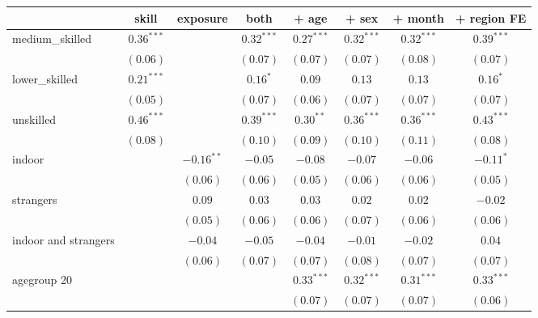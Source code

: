 
\begin{table}
\begin{center}
\begin{tabular}{l c c c c c c c }
\hline
 & skill & exposure & both & + age & + sex & + month & + region FE \\
\hline
medium\_skilled      & $0.36^{***}$ &              & $0.32^{***}$ & $0.27^{***}$ & $0.32^{***}$ & $0.32^{***}$ & $0.39^{***}$  \\
                     & $(0.06)$     &              & $(0.07)$     & $(0.07)$     & $(0.07)$     & $(0.08)$     & $(0.07)$      \\
lower\_skilled       & $0.21^{***}$ &              & $0.16^{*}$   & $0.09$       & $0.13$       & $0.13$       & $0.16^{*}$    \\
                     & $(0.05)$     &              & $(0.07)$     & $(0.06)$     & $(0.07)$     & $(0.07)$     & $(0.07)$      \\
unskilled            & $0.46^{***}$ &              & $0.39^{***}$ & $0.30^{**}$  & $0.36^{***}$ & $0.36^{***}$ & $0.43^{***}$  \\
                     & $(0.08)$     &              & $(0.10)$     & $(0.09)$     & $(0.10)$     & $(0.11)$     & $(0.08)$      \\
indoor               &              & $-0.16^{**}$ & $-0.05$      & $-0.08$      & $-0.07$      & $-0.06$      & $-0.11^{*}$   \\
                     &              & $(0.06)$     & $(0.06)$     & $(0.05)$     & $(0.06)$     & $(0.06)$     & $(0.05)$      \\
strangers            &              & $0.09$       & $0.03$       & $0.03$       & $0.02$       & $0.02$       & $-0.02$       \\
                     &              & $(0.05)$     & $(0.06)$     & $(0.06)$     & $(0.07)$     & $(0.06)$     & $(0.06)$      \\
indoor and strangers &              & $-0.04$      & $-0.05$      & $-0.04$      & $-0.01$      & $-0.02$      & $0.04$        \\
                     &              & $(0.06)$     & $(0.07)$     & $(0.07)$     & $(0.08)$     & $(0.07)$     & $(0.07)$      \\
agegroup 20          &              &              &              & $0.33^{***}$ & $0.32^{***}$ & $0.31^{***}$ & $0.33^{***}$  \\
                     &              &              &              & $(0.07)$     & $(0.07)$     & $(0.07)$     & $(0.06)$      \\

\end{tabular}
\end{center}
\end{table}

